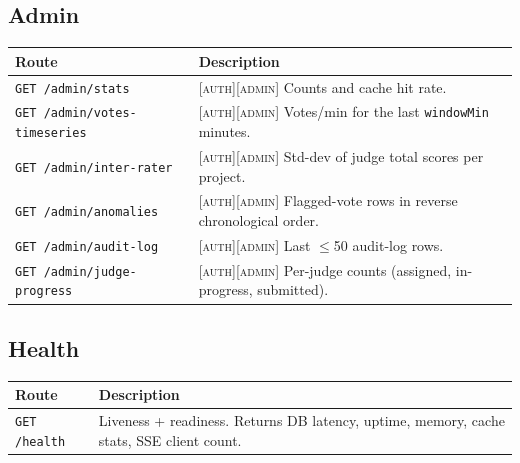 \subsection{Admin}

\begin{longtable}{p{}p{}}
  \toprule
  \textbf{Route} & \textbf{Description} \\ \midrule
  \texttt{GET /admin/stats}            & [\textsc{auth}][\textsc{admin}] Counts and cache hit rate. \\
  \texttt{GET /admin/votes-timeseries} & [\textsc{auth}][\textsc{admin}] Votes/min for the last \texttt{windowMin} minutes. \\
  \texttt{GET /admin/inter-rater}      & [\textsc{auth}][\textsc{admin}] Std-dev of judge total scores per project. \\
  \texttt{GET /admin/anomalies}        & [\textsc{auth}][\textsc{admin}] Flagged-vote rows in reverse chronological order. \\
  \texttt{GET /admin/audit-log}        & [\textsc{auth}][\textsc{admin}] Last \(\leq\)50 audit-log rows. \\
  \texttt{GET /admin/judge-progress}   & [\textsc{auth}][\textsc{admin}] Per-judge counts (assigned, in-progress, submitted). \\
  \bottomrule
\end{longtable}

\subsection{Health}

\begin{longtable}{p{}p{}}
  \toprule
  \textbf{Route} & \textbf{Description} \\ \midrule
  \texttt{GET /health} & Liveness + readiness. Returns DB latency, uptime, memory, cache stats, SSE client count. \\
  \bottomrule
\end{longtable}

